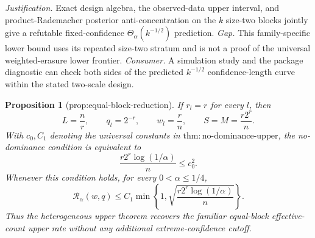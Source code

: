 \documentclass{article}
\newtheorem{proposition}{Proposition}
\begin{document}
\par\smallskip\noindent \textit{Justification.} Exact design algebra, the observed-data upper interval, and product-Rademacher posterior anti-concentration on the \(k\) size-two blocks jointly give a refutable fixed-confidence \(\Theta_\alpha(k^{-1/2})\) prediction. \textit{Gap.} This family-specific lower bound uses its repeated size-two stratum and is not a proof of the universal weighted-erasure lower frontier. \textit{Consumer.} A simulation study and the package diagnostic can check both sides of the predicted \(k^{-1/2}\) confidence-length curve within the stated two-scale design.

\begin{proposition}[prop:equal-block-reduction]\label{prop:equal-block-reduction}
If \(r_l=r\) for every \(l\), then
\[
 L=\frac nr,\qquad q_l=2^{-r},\qquad w_l=\frac rn,
 \qquad S=M=\frac{r2^r}{n}.
\]
With \(c_0,C_1\) denoting the universal constants in
\(\mathrm{thm{:}no\text{-}dominance\text{-}upper}\), the no-dominance
condition is equivalent to
\[
 \frac{r2^r\log(1/\alpha)}{n}\le c_0^2.
\]
Whenever this condition holds, for every \(0<\alpha\le1/4\),
\[
 \mathcal R_\alpha(w,q)
 \le C_1\min\left\{1,
       \sqrt{\frac{r2^r\log(1/\alpha)}{n}}\right\}.
\]
Thus the heterogeneous upper theorem recovers the familiar
equal-block effective-count upper rate without any additional
extreme-confidence cutoff.
\end{proposition}
\end{document}
